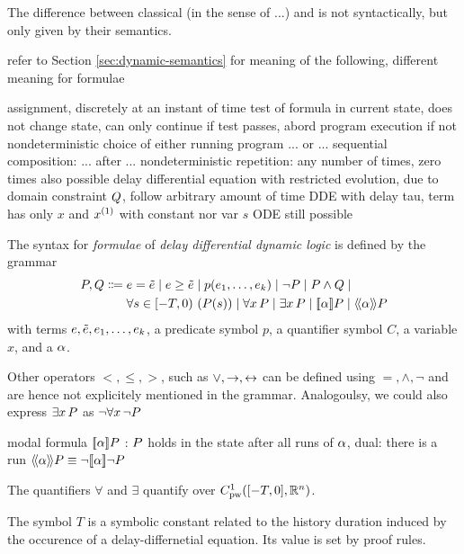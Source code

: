     The difference between classical \HPs (in the sense of ...) and \dHPs is not syntactically, but only given by their semantics.

    refer to Section \ref{sec:dynamic-semantics} for meaning of the following, different meaning for formulae

    assignment, discretely at an instant of time
    test of formula in current state, does not change state, can only continue if test passes, abord program execution if not
    nondeterministic choice of either running program ... or ...
    sequential composition: ... after ...
    nondeterministic repetition: any number of times, zero times also possible
    delay differential equation with restricted evolution, due to domain constraint $Q$, follow arbitrary amount of time
    DDE with delay tau, term has only $x$ and $\D{x}$ with constant nor var $s$
    ODE still possible


    \begin{definition}\label{def:syntax-formula}
        The syntax for \emph{formulae} of \emph{delay differential dynamic logic} is defined by the grammar
        \begin{align*}
            \asfml,\bsfml \Coloneqq{}& %
                \astrm = \bstrm \mid
                \astrm\geq\bstrm \mid
                p(\range{\istrm{1}}{\istrm{k}}) \mid
                \lnot\asfml \mid
                \asfml\land\bsfml \mid\\
                &\holdssince{T}{\asfml(s)} \mid
                \lforall{x}{\asfml} \mid
                \lexists{x}{\asfml} \mid
                \dbox{\asprg}{\asfml} \mid
                \ddiamond{\asprg}{\asfml}
        \end{align*}
        with \ddL terms $e,\tilde{e},e_{1},\ldots,e_{k}$,
        a predicate symbol $p$, a quantifier symbol $C$, a variable $x$, and a \dHP $\alpha$.
        
        Other operators $<,\leq,>$, such as $\lor,\rightarrow,\leftrightarrow$ can be defined using $=,\land,\lnot$ and are hence not explicitely mentioned in the grammar.
        Analogoulsy, we could also express $\exists x{\,} P$ as $\lnot\forall x{\,} \lnot P$

        modal formula $\dbox{\asprg}{\asfml}$ : $P$ holds in the state after all runs of $\alpha$, dual: there is a run
        $\ddiamond{\asprg}{\asfml}\equiv\lnot\dbox{\asprg}{\lnot\asfml}$

        The quantifiers $\forall$ and $\exists$ quantify over $\statespace$.

        The symbol $T$ is a symbolic constant related to the history duration induced by the occurence of a delay-differnetial equation. Its value is set by proof rules.
    \end{definition}

